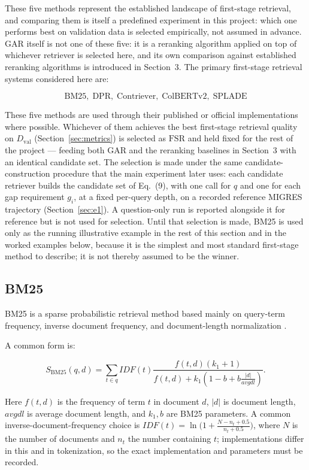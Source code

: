 \documentclass[11pt,a4paper]{article}
\begin{document}
These five methods represent the established landscape of first-stage retrieval, and comparing them is itself a predefined experiment in this project: which one performs best on validation data is selected empirically, not assumed in advance. GAR itself is not one of these five: it is a reranking algorithm applied on top of whichever retriever is selected here, and its own comparison against established reranking algorithms is introduced in Section~3. The primary first-stage retrieval systems considered here are:

\[
\boxed{
\text{BM25},\;
\text{DPR},\;
\text{Contriever},\;
\text{ColBERTv2},\;
\text{SPLADE}
}
\]

These five methods are used through their published or official implementations where possible. Whichever of them achieves the best first-stage retrieval quality on $D_{\mathrm{val}}$ (Section~\ref{sec:metrics}) is selected as $\mathrm{FSR}$ and held fixed for the rest of the project --- feeding both GAR and the reranking baselines in Section~3 with an identical candidate set. The selection is made under the same candidate-construction procedure that the main experiment later uses: each candidate retriever builds the candidate set of Eq.~(9), with one call for $q$ and one for each gap requirement $g_i$, at a fixed per-query depth, on a recorded reference MIGRES trajectory (Section~\ref{sec:e1}). A question-only run is reported alongside it for reference but is not used for selection. Until that selection is made, BM25 is used only as the running illustrative example in the rest of this section and in the worked examples below, because it is the simplest and most standard first-stage method to describe; it is not thereby assumed to be the winner.

\subsection{BM25}

BM25 is a sparse probabilistic retrieval method based mainly on query-term frequency, inverse document frequency, and document-length normalization \citep{robertson-zaragoza-2009}.

A common form is:

\[
S_{\mathrm{BM25}}(q,d)
=
\sum_{t\in q}
IDF(t)
\frac{
f(t,d)(k_1+1)
}{
f(t,d)+k_1
\left(
1-b+b\frac{|d|}{avgdl}
\right)
}.
\]

Here $f(t,d)$ is the frequency of term $t$ in document $d$, $|d|$ is document length, $avgdl$ is average document length, and $k_1,b$ are BM25 parameters. A common inverse-document-frequency choice is $IDF(t)=\ln\!\big(1+\frac{N-n_t+0.5}{n_t+0.5}\big)$, where $N$ is the number of documents and $n_t$ the number containing $t$; implementations differ in this and in tokenization, so the exact implementation and parameters must be recorded.
\end{document}
